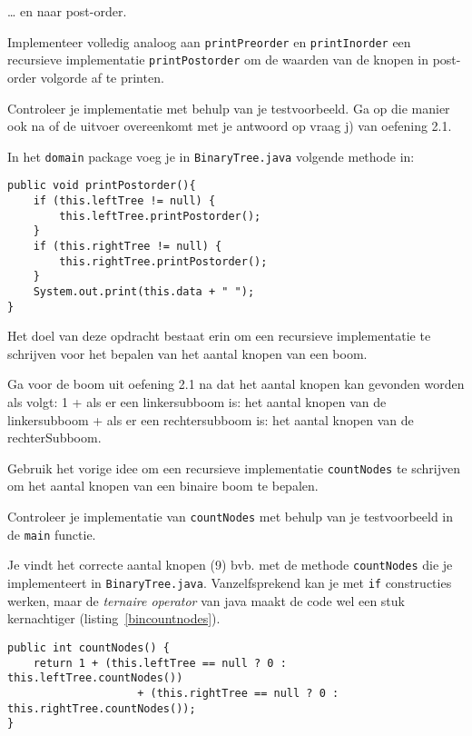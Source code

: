 \begin{oef}
\code … en naar post-order.
\begin{oefenumerate}
	\item Implementeer volledig analoog aan \verb=printPreorder= en \verb=printInorder= een recursieve implementatie \verb=printPostorder= om de waarden van de knopen in post-order volgorde af te printen.
	\item Controleer je implementatie met behulp van je testvoorbeeld. Ga op die manier ook na of de uitvoer  overeenkomt met je antwoord op vraag j) van oefening 2.1.
\end{oefenumerate}
\begin{opl}
In het \verb+domain+ package voeg je in \verb+BinaryTree.java+ volgende methode in:
\begin{lstlisting}[caption={Post-order doorloop van een binaire boom}, label=binpostorder]
public void printPostorder(){
	if (this.leftTree != null) {
		this.leftTree.printPostorder();
	}
	if (this.rightTree != null) {
		this.rightTree.printPostorder();
	}
	System.out.print(this.data + " ");
}
\end{lstlisting}
\end{opl}
\end{oef}


\begin{oef}
\code Het doel van deze opdracht bestaat erin om een recursieve implementatie te schrijven voor het bepalen van het aantal knopen van een boom.

\begin{oefenumerate}
	\item Ga voor de boom uit oefening 2.1 na dat het aantal knopen kan gevonden worden als volgt:  1 + als er een linkersubboom is: het aantal knopen van de linkersubboom  + als er een rechtersubboom is: het aantal knopen van de rechterSubboom.
	\item Gebruik het vorige idee om een recursieve implementatie \verb=countNodes= te schrijven om het aantal knopen van een binaire boom te bepalen.
	\item Controleer je implementatie van \verb=countNodes= met behulp van je testvoorbeeld in de \verb=main= functie.
\end{oefenumerate}
\begin{opl}
Je vindt het correcte aantal knopen (9) bvb. met de methode \verb+countNodes+ die je implementeert in \verb+BinaryTree.java+. Vanzelfsprekend kan je met \verb+if+ constructies werken, maar de \emph{ternaire operator} van java maakt de code wel een stuk kernachtiger (listing~\ref{bincountnodes}).
\begin{lstlisting}[caption={Tel het aantal knopen in een binaire boom}, label=bincountnodes]
public int countNodes() {
	return 1 + (this.leftTree == null ? 0 : this.leftTree.countNodes())
					+ (this.rightTree == null ? 0 : this.rightTree.countNodes());
}
\end{lstlisting}
\end{opl}
\end{oef}


